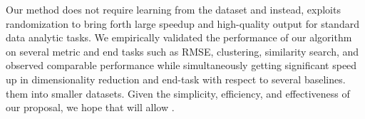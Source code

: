 Our method does not require learning from the dataset and instead, exploits randomization to bring forth large speedup and high-quality output for standard data analytic tasks. We empirically validated the performance of our algorithm on several metric and end tasks such as RMSE, clustering,  similarity search, and observed comparable performance while simultaneously getting significant speed up in dimensionality reduction and end-task with respect to several baselines.
 them into smaller datasets. Given the simplicity, efficiency, and effectiveness of our proposal, we hope that \fsketch will allow .

